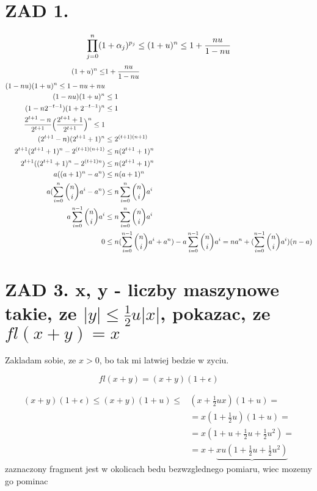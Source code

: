 \documentclass{article}[13pt]
\begin{document}
    \section*{ZAD 1.}
    \begin{align*}
        \prod\limits_{j=0}^n(1+\alpha_j)^{p_j}\leq (1+u)^n\leq 1+{nu\over 1-nu}
    \end{align*}
    \begin{align*}
        (1+u)^n\leq &1+{nu\over 1-nu}\\
        (1-nu)(1+u)^n\leq 1-nu+nu\\
        (1-nu)(1+u)^n&\leq 1\\
        (1-n2^{-t-1})(1+2^{-t-1})^n&\leq 1\\
        {2^{t+1}-n\over 2^{t+1}}\Big({2^{t+1}+1\over 2^{t+1}}\Big)^n\leq 1\\
        (2^{t+1}-n)(2^{t+1}+1)^n&\leq 2^{(t+1)(n+1)}\\
        2^{t+1}(2^{t+1}+1)^n-2^{(t+1)(n+1)}&\leq n(2^{t+1}+1)^n\\
        2^{t+1}((2^{t+1}+1)^n-2^{(t+1)n})&\leq n(2^{t+1}+1)^n\\
        a((a+1)^n-a^n)&\leq n(a+1)^n\\
        a(\sum\limits_{i=0}^n{n\choose i}a^i-a^n)&\leq n\sum\limits_{i=0}^n{n\choose i}a^i\\
        a\sum\limits_{i=0}^{n-1}{n\choose i}a^i&\leq n\sum\limits_{i=0}^n{n\choose i}a^i\\
        0&\leq n(\sum\limits_{i=0}^{n-1}{n\choose i}a^i+a^n)-a\sum\limits_{i=0}^{n-1}{n\choose i}a^i=na^n+(\sum\limits_{i=0}^{n-1}{n\choose i}a^i)(n-a)
    \end{align*}


    \section*{ZAD 3. x, y - liczby maszynowe takie, ze $|y|\leq \frac12 u|x|$, pokazac, ze $fl(x+y)=x$}

    Zakladam sobie, ze $x>0$, bo tak mi latwiej bedzie w zyciu.

    $$fl(x+y)=(x+y)(1+\epsilon)$$

    \begin{align*}
        (x+y)(1+\epsilon)\leq (x+y)(1+u)\leq &(x+\frac12ux)(1+u)=\\
        &=x(1+\frac12u)(1+u)=\\
        &=x(1+u+\frac12u+\frac12 u^2)=\\
        &=x+\underbrace{xu(1+\frac12u+\frac12u^2)}
    \end{align*}
    zaznaczony fragment jest w okolicach bedu bezwzglednego pomiaru, wiec mozemy go pominac
\end{document}
